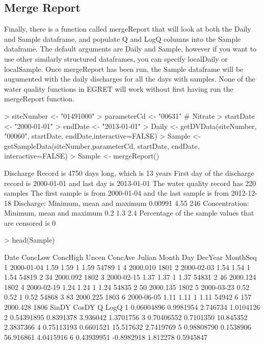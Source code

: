 \documentclass[a4paper,11pt]{article}
\begin{document}
\FloatBarrier
\subsection{Merge Report}
Finally, there is a function called mergeReport that will look at both the Daily and Sample dataframe, and populate Q and LogQ columns into the Sample dataframe. The default arguments are Daily and Sample, however if you want to use other similarly structured dataframes, you can specify localDaily or localSample. Once mergeReport has been run, the Sample dataframe will be augumented with the daily discharges for all the days with samples.  None of the water quality functions in EGRET will work without first having run the mergeReport function.


\begin{Schunk}
\begin{Sinput}
> siteNumber <- "01491000"
> parameterCd <- "00631"  # Nitrate
> startDate <- "2000-01-01"
> endDate <- "2013-01-01"
> Daily <- getDVData(siteNumber, "00060", startDate, endDate,interactive=FALSE)
> Sample <- getSampleData(siteNumber,parameterCd, startDate, endDate, interactive=FALSE)
> Sample <- mergeReport()
\end{Sinput}
\begin{Soutput}
 Discharge Record is 4750 days long, which is 13 years
 First day of the discharge record is 2000-01-01 and last day is 2013-01-01
 The water quality record has 220 samples
 The first sample is from 2000-01-04 and the last sample is from 2012-12-18
 Discharge: Minimum, mean and maximum 0.00991 4.55 246
 Concentration: Minimum, mean and maximum 0.2 1.3 2.4
 Percentage of the sample values that are censored is 0 %
\end{Soutput}
\begin{Sinput}
> head(Sample)
\end{Sinput}
\begin{Soutput}
        Date ConcLow ConcHigh Uncen ConcAve Julian Month Day  DecYear MonthSeq
1 2000-01-04    1.59     1.59     1    1.59  54789     1   4 2000.010     1801
2 2000-02-03    1.54     1.54     1    1.54  54819     2  34 2000.092     1802
3 2000-02-15    1.37     1.37     1    1.37  54831     2  46 2000.124     1802
4 2000-02-19    1.24     1.24     1    1.24  54835     2  50 2000.135     1802
5 2000-03-23    0.52     0.52     1    0.52  54868     3  83 2000.225     1803
6 2000-06-05    1.11     1.11     1    1.11  54942     6 157 2000.428     1806
       SinDY      CosDY         Q      LogQ
1 0.06004896  0.9981954  2.746734 1.0104126
2 0.54391895  0.8391378  3.936042 1.3701756
3 0.70406552  0.7101350 10.845352 2.3837366
4 0.75113193  0.6601521 15.517632 2.7419769
5 0.98808790  0.1538906 56.916861 4.0415916
6 0.43939951 -0.8982918  1.812278 0.5945847
\end{Soutput}
\end{Schunk}
\end{document}
